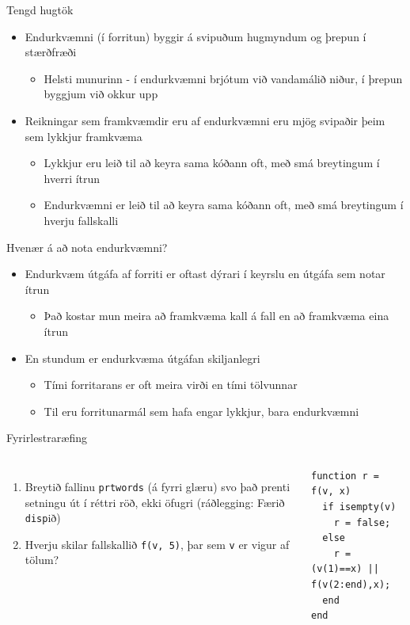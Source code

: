 \documentclass[handout]{beamer}
\begin{document}
\begin{frame}{Tengd hugtök}
\begin{itemize}
 \item Endurkvæmni (í forritun) byggir á svipuðum hugmyndum og þrepun í stærðfræði
 \begin{itemize}
   \item Helsti munurinn - í endurkvæmni brjótum við vandamálið niður, í þrepun byggjum við okkur upp
 \end{itemize}
 \item Reikningar sem framkvæmdir eru af endurkvæmni eru mjög svipaðir þeim sem lykkjur framkvæma
 \begin{itemize}
  \item Lykkjur eru leið til að keyra sama kóðann oft, með smá breytingum í hverri ítrun
  \item Endurkvæmni er leið til að keyra sama kóðann oft, með smá breytingum í hverju fallskalli
 \end{itemize}
\end{itemize}

\end{frame}

\begin{frame}{Hvenær á að nota endurkvæmni?}
\begin{itemize}
 \item Endurkvæm útgáfa af forriti er oftast dýrari í keyrslu en útgáfa sem notar ítrun
 \begin{itemize}
  \item Það kostar mun meira að framkvæma kall á fall en að framkvæma eina ítrun
 \end{itemize}
 \item En stundum er endurkvæma útgáfan skiljanlegri
 \begin{itemize}
  \item Tími forritarans er oft meira virði en tími tölvunnar
  \item Til eru forritunarmál sem hafa engar lykkjur, bara endurkvæmni
 \end{itemize}
\end{itemize}
\end{frame}

\begin{frame}[fragile]{Fyrirlestraræfing}
\begin{columns}
\begin{enumerate}
    \item Breytið fallinu \texttt{prtwords} (á fyrri glæru) svo það prenti setningu út í réttri röð, ekki öfugri (ráðlegging: Færið \texttt{disp}ið)
    \item Hverju skilar fallskallið \texttt{f(v, 5)}, þar sem \texttt{v} er vigur af tölum?
\end{enumerate}

\begin{verbatim}
function r = f(v, x)
  if isempty(v)
    r = false;
  else
    r = (v(1)==x) || f(v(2:end),x);
  end
end
\end{verbatim}

\end{columns}
\end{frame}
\end{document}
